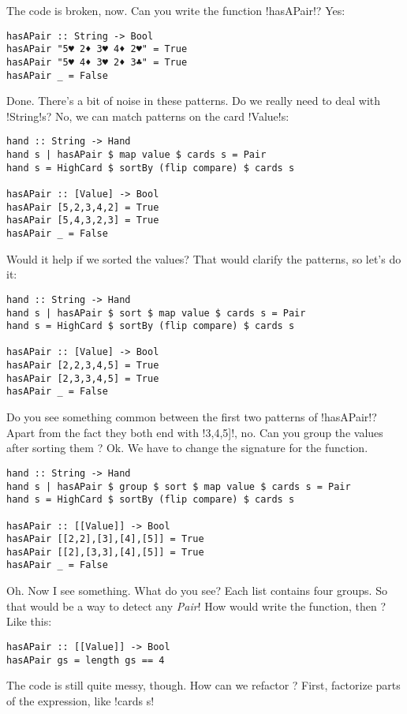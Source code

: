 \error The code is broken, now.
\lhN Can you write the function \il!hasAPair!?
\lhA Yes:
\begin{lstlisting}[frame=single]
hasAPair :: String -> Bool
hasAPair "5♥ 2♦ 3♥ 4♦ 2♥" = True 
hasAPair "5♥ 4♦ 3♥ 2♦ 3♣" = True
hasAPair _ = False
\end{lstlisting}
\success Done.
\lhN There's a bit of noise in these patterns. Do we really need to deal with \il!String!s?
\lhA \success No, we can match patterns on the card \il!Value!s:
\begin{lstlisting}[frame=single]
hand :: String -> Hand
hand s | hasAPair $ map value $ cards s = Pair
hand s = HighCard $ sortBy (flip compare) $ cards s

hasAPair :: [Value] -> Bool
hasAPair [5,2,3,4,2] = True 
hasAPair [5,4,3,2,3] = True
hasAPair _ = False
\end{lstlisting}
\lhN Would it help if we sorted the values?
\lhA \success That would clarify the patterns, so let's do it:
\begin{lstlisting}[frame=single]
hand :: String -> Hand
hand s | hasAPair $ sort $ map value $ cards s = Pair
hand s = HighCard $ sortBy (flip compare) $ cards s

hasAPair :: [Value] -> Bool
hasAPair [2,2,3,4,5] = True 
hasAPair [2,3,3,4,5] = True
hasAPair _ = False
\end{lstlisting} %
\lhN Do you see something common between the first two patterns of \il!hasAPair!?
\lhA Apart from the fact they both end with \il!3,4,5]!, no.
\lhN Can you group the values after sorting them ?
\lhA \success Ok. We have to change the signature for the function.
\begin{lstlisting}[frame=single]
hand :: String -> Hand
hand s | hasAPair $ group $ sort $ map value $ cards s = Pair
hand s = HighCard $ sortBy (flip compare) $ cards s

hasAPair :: [[Value]] -> Bool
hasAPair [[2,2],[3],[4],[5]] = True 
hasAPair [[2],[3,3],[4],[5]] = True
hasAPair _ = False
\end{lstlisting}
\success Oh. Now I see something.
\lhN What do you see?
\lhA Each list contains four groups. So that would be a way to detect any \emph{Pair}!
\lhN How would write the function, then ?
\lhA \success Like this:
\begin{lstlisting}[frame=single]
hasAPair :: [[Value]] -> Bool
hasAPair gs = length gs == 4 
\end{lstlisting}
\success The code is still quite messy, though.
\lhN How can we refactor ?
\lhA First, factorize parts of the expression, like \il!cards s!   
